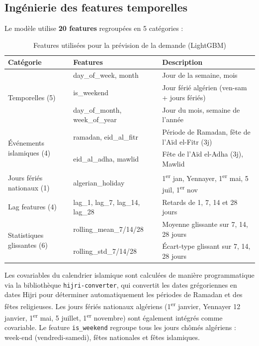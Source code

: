 \documentclass[12pt,a4paper]{report}
\begin{document}
\subsection{Ing\'{e}nierie des features temporelles}

Le mod\`{e}le utilise \textbf{20 features} regroup\'{e}es en 5 cat\'{e}gories :

\begin{table}[H]
\centering
\caption{Features utilis\'{e}es pour la pr\'{e}vision de la demande (LightGBM)}
\label{tab:forecast_features}
\begin{tabularx}{\textwidth}{l l X}
\toprule
\textbf{Cat\'{e}gorie} & \textbf{Features} & \textbf{Description} \\
\midrule
\multirow{3}{*}{Temporelles (5)} & day\_of\_week, month & Jour de la semaine, mois \\
 & is\_weekend & Jour f\'{e}ri\'{e} alg\'{e}rien (ven-sam + jours f\'{e}ri\'{e}s) \\
 & day\_of\_month, week\_of\_year & Jour du mois, semaine de l'ann\'{e}e \\
\midrule
\multirow{2}{*}{\'{E}v\'{e}nements islamiques (4)} & ramadan, eid\_al\_fitr & P\'{e}riode de Ramadan, f\^{e}te de l'A\"{i}d el-Fitr (3j) \\
 & eid\_al\_adha, mawlid & F\^{e}te de l'A\"{i}d el-Adha (3j), Mawlid \\
\midrule
Jours f\'{e}ri\'{e}s nationaux (1) & algerian\_holiday & 1\textsuperscript{er} jan, Yennayer,  1\textsuperscript{er} mai, 5 juil, 1\textsuperscript{er} nov \\
\midrule
Lag features (4) & lag\_1, lag\_7, lag\_14, lag\_28 & Retards de 1, 7, 14 et 28 jours \\
\midrule
\multirow{2}{*}{Statistiques glissantes (6)} & rolling\_mean\_7/14/28 & Moyenne glissante sur 7, 14, 28 jours \\
 & rolling\_std\_7/14/28 & \'{E}cart-type glissant sur 7, 14, 28 jours \\
\bottomrule
\end{tabularx}
\end{table}

Les covariables du calendrier islamique sont calcul\'{e}es de mani\`{e}re programmatique via la biblioth\`{e}que \texttt{hijri-converter}, qui convertit les dates gr\'{e}goriennes en dates Hijri pour d\'{e}terminer automatiquement les p\'{e}riodes de Ramadan et des f\^{e}tes religieuses. Les jours f\'{e}ri\'{e}s nationaux alg\'{e}riens (1\textsuperscript{er} janvier, Yennayer 12 janvier, 1\textsuperscript{er} mai, 5 juillet, 1\textsuperscript{er} novembre) sont \'{e}galement int\'{e}gr\'{e}s comme covariable. Le feature \texttt{is\_weekend} regroupe tous les jours ch\^{o}m\'{e}s alg\'{e}riens : week-end (vendredi-samedi), f\^{e}tes nationales et f\^{e}tes islamiques.
\end{document}
